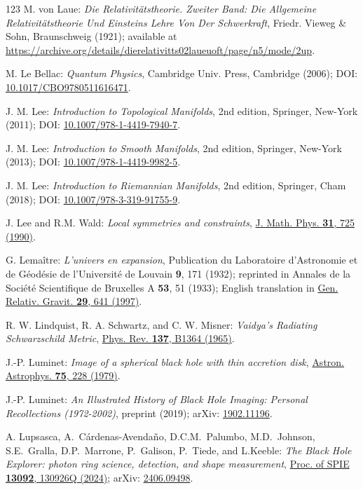 \begin{thebibliography}{123}
M. von Laue: {\em Die Relativitätstheorie. Zweiter Band: Die Allgemeine Relativitätstheorie Und Einsteins Lehre Von Der Schwerkraft},
Friedr. Vieweg \& Sohn, Braunschweig (1921); available at
\url{https://archive.org/details/dierelativitts02laueuoft/page/n5/mode/2up}.

M. Le Bellac:
{\em Quantum Physics},
Cambridge Univ. Press, Cambridge (2006);
DOI: \href{https://doi.org/10.1017/CBO9780511616471}{10.1017/CBO9780511616471}.

J. M. Lee:
{\em Introduction to Topological Manifolds}, 2nd edition,
Springer, New-York (2011);
DOI: \href{https://doi.org/10.1007/978-1-4419-7940-7}{10.1007/978-1-4419-7940-7}.

J. M. Lee:
{\em Introduction to Smooth Manifolds}, 2nd edition,
Springer, New-York (2013);
DOI: \href{https://doi.org/10.1007/978-1-4419-9982-5}{10.1007/978-1-4419-9982-5}.

J. M. Lee:
{\em Introduction to Riemannian Manifolds}, 2nd edition,
Springer, Cham (2018);
DOI: \href{https://doi.org/10.1007/978-3-319-91755-9}{10.1007/978-3-319-91755-9}.

J. Lee and R.M. Wald:
{\em Local symmetries and constraints},
 \href{https://doi.org/10.1063/1.528801}{J. Math. Phys. {\bf 31}, 725 (1990)}.

G. Lemaître: {\em L'univers en expansion},
Publication du Laboratoire d'Astronomie et de Géodésie de l'Université
de Louvain {\bf 9},  171 (1932); reprinted in
Annales de la Société Scientifique de Bruxelles A {\bf 53}, 51 (1933);
English translation in
\href{https://doi.org/10.1023/A:1018855621348}{Gen. Relativ. Gravit. {\bf 29}, 641 (1997)}.

R. W. Lindquist, R. A. Schwartz, and C. W. Misner:
{\em Vaidya's Radiating Schwarzschild Metric},
\href{https://doi.org/10.1103/PhysRev.137.B1364}{Phys. Rev. {\bf 137}, B1364 (1965)}.

J.-P. Luminet: {\em Image of a spherical black hole with thin accretion disk},
\href{https://ui.adsabs.harvard.edu/abs/1979A%26A....75..228L}{Astron. Astrophys. {\bf 75}, 228 (1979)}.

J.-P. Luminet:
{\em An Illustrated History of Black Hole Imaging: Personal Recollections (1972-2002)}, preprint (2019);
arXiv: \href{https://arxiv.org/abs/1902.11196}{1902.11196}.

A. Lupsasca, A.~Cárdenas-Avendaño, D.C.M.~Palumbo, M.D.~Johnson, S.E.~Gralla, D.P.~Marrone, P.~Galison, P.~Tiede, and L.Keeble:
{\em The Black Hole Explorer: photon ring science, detection, and shape measurement},
\href{https://doi.org/10.1117/12.3019437}{Proc. of SPIE {\bf 13092}, 130926Q (2024)};
arXiv: \href{https://arxiv.org/abs/2406.09498}{2406.09498}.


\end{thebibliography}
